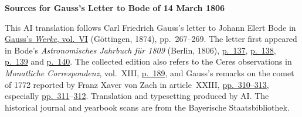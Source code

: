 \clearpage\thispagestyle{empty}
\begin{center}\textbf{Sources for Gauss’s Letter to Bode of 14 March 1806}\end{center}
\noindent This AI translation follows Carl Friedrich Gauss’s letter to Johann Elert Bode in \href{https://gdz.sub.uni-goettingen.de/id/PPN236007467}{Gauss’s \textit{Werke}, vol.~VI} (Göttingen, 1874), pp.~267--269. The letter first appeared in Bode’s \textit{Astronomisches Jahrbuch für 1809} (Berlin, 1806), \href{https://www.digitale-sammlungen.de/en/view/bsb10538338?page=147}{p.~137}, \href{https://www.digitale-sammlungen.de/en/view/bsb10538338?page=148}{p.~138}, \href{https://www.digitale-sammlungen.de/en/view/bsb10538338?page=149}{p.~139} and \href{https://www.digitale-sammlungen.de/en/view/bsb10538338?page=150}{p.~140}. The collected edition also refers to the Ceres observations in \textit{Monatliche Correspondenz}, vol.~XIII, \href{https://www.digitale-sammlungen.de/en/view/bsb10538605?page=197}{p.~189}, and Gauss’s remarks on the comet of 1772 reported by Franz Xaver von Zach in article~XXIII, \href{https://www.digitale-sammlungen.de/en/view/bsb10538605?page=320}{pp.~310--313}, especially \href{https://www.digitale-sammlungen.de/en/view/bsb10538605?page=321}{pp.~311}--\href{https://www.digitale-sammlungen.de/en/view/bsb10538605?page=322}{312}. Translation and typesetting produced by AI. The historical journal and yearbook scans are from the Bayerische Staatsbibliothek.
\clearpage
